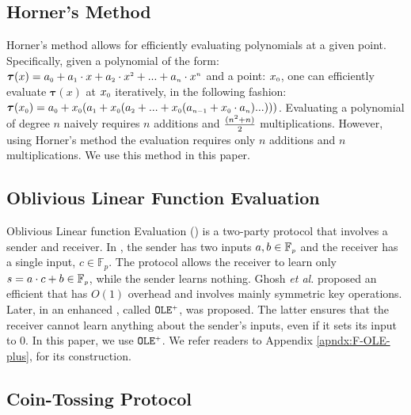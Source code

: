 \vs
\vs

\subsection{Horner's Method}
Horner's method \cite{DBLP:journals/ibmrd/Dorn62} allows for efficiently evaluating polynomials at a given point. Specifically, given a polynomial of the form: $\bm\tau(x)= a_{\scriptscriptstyle 0}+a_{\scriptscriptstyle 1}\cdot x+a_{\scriptscriptstyle 2}\cdot x^{\scriptscriptstyle 2}+...+a_{\scriptscriptstyle n}\cdot x^{\scriptscriptstyle n}$ and a point: $x_{\scriptscriptstyle 0}$, one can efficiently evaluate $\bm\tau(x)$ at $x_{\scriptscriptstyle 0}$ iteratively, in the following fashion: $\bm\tau(x_{\scriptscriptstyle 0})=a_{\scriptscriptstyle 0}+x_{\scriptscriptstyle 0}(a_{\scriptscriptstyle 1} + x_{\scriptscriptstyle 0}(a_{\scriptscriptstyle 2}+...+x_{\scriptscriptstyle 0}(a_{\scriptscriptstyle n-1}+x_{\scriptscriptstyle 0}\cdot a_{\scriptscriptstyle n})...)))$. Evaluating  a polynomial of degree $n$ naively requires  $n$ additions and $\frac{(n^{\scriptscriptstyle 2}+n)}{2}$ multiplications. However, using Horner's method the evaluation requires only $n$ additions and $n$ multiplications. We use this method in this paper. 

\vs
\vs

\subsection{Oblivious Linear Function Evaluation}\label{sec::OLE-plus}

Oblivious Linear function Evaluation (\ole) is a two-party protocol that involves a sender and receiver. In \ole,  the sender  has two  inputs  $a, b\in \mathbb{F}_{\scriptscriptstyle p}$ and the receiver has a single input, $c \in \mathbb{F}_{p}$.  The protocol allows the receiver to learn only $s = a\cdot c + b \in \mathbb{F}_{\scriptscriptstyle p}$, while the sender learns nothing. Ghosh \textit{et al.} \cite{GhoshNN17} proposed an efficient \ole that has $O(1)$ overhead and involves mainly symmetric key operations. Later, in \cite{GhoshN19} an enhanced \ole, called $\mathtt{OLE}^{\scriptscriptstyle +}$, was proposed. The latter ensures that the receiver cannot learn anything about the sender's inputs,  even if it sets its input to $0$. In this paper, we use $\mathtt{OLE}^{\scriptscriptstyle +}$. We refer readers to Appendix \ref{apndx:F-OLE-plus}, for its construction.  %


\vs
\vs
\subsection{Coin-Tossing Protocol}

